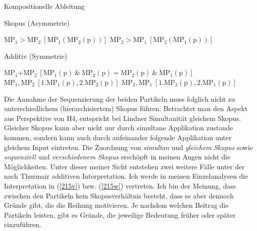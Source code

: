 \begin{exe}
	\ex\label{215hh} 
	Kompositionelle Ableitung
		\begin{xlist}	
			\ex\label{215a} Skopus (Asymmetrie)
				\begin{xlist}
						\ex\label{215s} $\textrm{MP}_{1} > \textrm{MP}_{2} \ [\textrm{MP}_{1}(\textrm{MP}_{2}(\textrm{p}))]$
						\ex\label{215t} $\textrm{MP}_{2} > \textrm{MP}_{1} \ [\textrm{MP}_{2}(\textrm{MP}_{1}(\textrm{p}))]$
				\end{xlist}			
			\ex\label{215b} Additiv (Symmetrie)
				\begin{xlist} 		
						\ex\label{215u} $\textrm{MP}_{1} $+$ \textrm{MP}_{2} \ [\textrm{MP}_{1}(\textrm{p}) \ \& \ \textrm{MP}_{2}(\textrm{p}) = \textrm{MP}_{2}(\textrm{p}) \ \& \ \textrm{MP}_{1}(\textrm{p})]$
						\ex\label{215v} $\textrm{MP}_{1}, \textrm{MP}_{2} \ [1. \textrm{MP}_{1}(\textrm{p}), 2. \textrm{MP}_{2}(\textrm{p})]$
						\ex\label{215w} $\textrm{MP}_{2}, \textrm{MP}_{1} \ [1. \textrm{MP}_{2}(\textrm{p}), 2. \textrm{MP}_{1}(\textrm{p})]$
				\end{xlist}
		\end{xlist}	
\end{exe}
Die Annahme der Sequenzierung der beiden Partikeln muss folglich nicht zu unterschiedlichem (hierarchisiertem) Skopus  führen. Betrachtet man den Aspekt aus Perspektive von H4, entspricht bei Lindner Simultanität gleichem Skopus. Gleicher Skopus kann aber nicht nur durch simultane Applikation zustande kommen, sondern kann auch durch aufeinander folgende Applikation unter gleichem Input eintreten. Die Zuordnung von \textit{simultan} und \textit{gleichem Skopus} sowie \textit{sequenziell} und \textit{verschiedenem Skopus} erschöpft in meinen Augen nicht die Möglichkei\-ten. Unter dieser meiner Sicht entstehen zwei weitere Fälle unter der nach Thurmair additiven Interpretation. Ich werde in meinen Einzelanalysen die Interpretation in (\ref{215v}) bzw. (\ref{215w}) vertreten. Ich bin der Meinung, dass zwischen den Partikeln kein Skopusverhältnis besteht, dass es aber dennoch Gründe gibt, die die Reihung motivieren. Je nachdem welchen Beitrag die Partikeln leisten, gibt es Gründe, die jeweilige Bedeutung früher oder später einzuführen.

